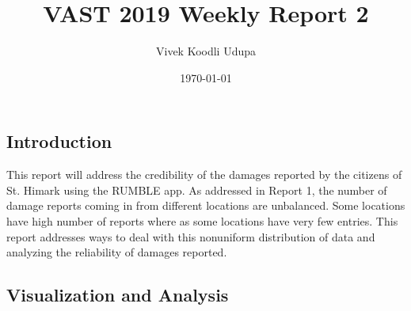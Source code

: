 \documentclass[12pt]{extarticle}
\title{VAST 2019 Weekly Report 2}
\author{Vivek Koodli Udupa}
\date{\today}
\begin{document}
\maketitle

\begin{centering}
	\section{Introduction}
\end{centering}
This report will address the credibility of the damages reported by the citizens of St. Himark using the RUMBLE app. As addressed in Report 1, the number of damage reports coming in from different locations are unbalanced. Some locations have high number of reports where as some locations have very few entries. This report addresses ways to deal with this nonuniform distribution of data and analyzing the reliability of damages reported.  \\

\begin{centering}
	\section{Visualization and Analysis}
\end{centering}
\end{document}
